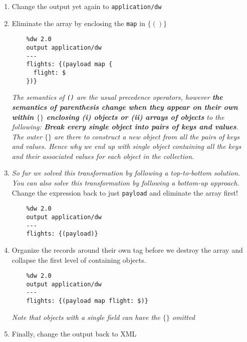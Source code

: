 \begin{enumerate}[resume*]
\item Change the output yet again to \texttt{application/dw}
\item Eliminate the array by enclosing the \texttt{map} in \texttt{$\{()\}$}
  \begin{lstlisting}
    %dw 2.0
    output application/dw
    ---
    flights: {(payload map {
      flight: $
    })}
  \end{lstlisting}
  \emph{
    The semantics of \texttt{()} are the usual precedence operators, however \textbf{the semantics of parenthesis change when they appear on their own within \texttt{$\{\}$} enclosing (i) objects or (ii) arrays of objects} to the following: \textbf{Break every single object into pairs of keys and values}. The outer \texttt{$\{\}$} are there to construct a new object from all the pairs of keys and values. Hence why we end up with single object containing all the keys and their associated values for each object in the collection.
  }
\item \emph{So far we solved this transformation by following a top-to-bottom solution.  You can also solve this transformation by following a bottom-up approach.}
  \newline
  Change the expression back to just \texttt{payload} and eliminate the array first!
  \begin{lstlisting}
    %dw 2.0
    output application/dw
    ---
    flights: {(payload)}
  \end{lstlisting}
\item Organize the records around their own tag before we destroy the array and collapse the first level of containing objects.
  \begin{lstlisting}
    %dw 2.0
    output application/dw
    ---
    flights: {(payload map flight: $)}
  \end{lstlisting}
  \emph{Note that objects with a single field can have the \texttt{$\{\}$} omitted}
\item Finally, change the output back to XML
  
\end{enumerate}

